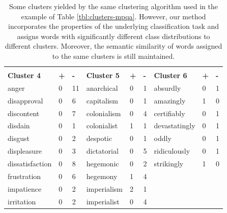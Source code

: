 \begin{table}
\begin{tabular}{lll|lll|lll}
                   &            &            &                    &            &            &                    &            &            \\
\textbf{Cluster 4} & \textbf{+} & \textbf{-} & \textbf{Cluster 5} & \textbf{+} & \textbf{-} & \textbf{Cluster 6} & \textbf{+} & \textbf{-} \\ \hline
anger              & 0          & 11         & anarchical         & 0          & 1          & absurdly           & 0          & 1          \\
disapproval        & 0          & 6          & capitalism         & 0          & 1          & amazingly          & 1          & 0          \\
discontent         & 0          & 7          & colonialism        & 0          & 4          & certifiably        & 0          & 1          \\
disdain            & 0          & 1          & colonialist        & 1          & 1          & devastatingly      & 0          & 1          \\
disgust            & 0          & 2          & despotic           & 0          & 1          & oddly              & 0          & 1          \\
displeasure        & 0          & 3          & dictatorial        & 0          & 5          & ridiculously       & 0          & 1          \\
dissatisfaction    & 0          & 8          & hegemonic          & 0          & 2          & strikingly         & 1          & 0          \\
frustration        & 0          & 6          & hegemony           & 1          & 4          &                    &            &            \\
impatience         & 0          & 2          & imperialism        & 2          & 1          &                    &            &            \\
irritation         & 0          & 2          & imperialist        & 0          & 4          &                    &            &           
\end{tabular}
\label{tbl:clusters-mpqa-ours}
\caption{Some clusters yielded by the same clustering algorithm used in the
example of Table \ref{tbl:clusters-mpqa}. However, our method incorporates the
properties of the underlying classification task and assigns words with
significantly different class distributions to different clusters. Moreover,
the semantic similarity of words assigned to the same clusters is still
maintained.}
\end{table}
 
